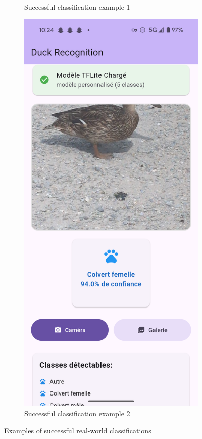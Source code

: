 \documentclass[12pt,a4paper]{article}
\begin{document}
\begin{figure}[H]
\begin{subfigure}[b]{0.45\textwidth}
        \caption{Successful classification example 1}
        \label{fig:success1}
    \end{subfigure}
    \hfill
    \begin{subfigure}[b]{0.45\textwidth}
        \centering
        \includegraphics[width=\textwidth]{../../images/Results/Screenshot_20250615-102401.png}
        \caption{Successful classification example 2}
        \label{fig:success2}
    \end{subfigure}
    \caption{Examples of successful real-world classifications}
    \label{fig:successful_classifications}
\end{figure}
\end{document}
